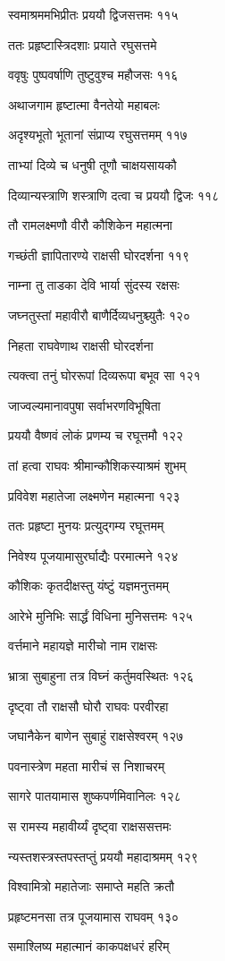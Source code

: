 स्वमाश्रममभिप्रीतः प्रययौ द्विजसत्तमः ११५

ततः प्रहृष्टास्त्रिदशाः प्रयाते रघुसत्तमे

ववृषुः पुष्पवर्षाणि तुष्टुवुश्च महौजसः ११६

अथाजगाम हृष्टात्मा वैनतेयो महाबलः

अदृश्यभूतो भूतानां संप्राप्य रघुसत्तमम् ११७

ताभ्यां दिव्ये च धनुषी तूणौ चाक्षयसायकौ

दिव्यान्यस्त्राणि शस्त्राणि दत्वा च प्रययौ द्विजः ११८

तौ रामलक्ष्मणौ वीरौ कौशिकेन महात्मना

गच्छंती ज्ञापितारण्ये राक्षसी घोरदर्शना ११९

नाम्ना तु ताडका देवि भार्या सुंदस्य रक्षसः

जघ्नतुस्तां महावीरौ बाणैर्दिव्यधनुश्च्युतैः १२०

निहता राघवेणाथ राक्षसी घोरदर्शना

त्यक्त्वा तनुं घोररूपां दिव्यरूपा बभूव सा १२१

जाज्वल्यमानावपुषा सर्वाभरणविभूषिता

प्रययौ वैष्णवं लोकं प्रणम्य च रघूत्तमौ १२२

तां हत्वा राघवः श्रीमान्कौशिकस्याश्रमं शुभम्

प्रविवेश महातेजा लक्ष्मणेन महात्मना १२३

ततः प्रहृष्टा मुनयः प्रत्युद्गम्य रघूत्तमम्

निवेश्य पूजयामासुरर्घाद्यैः परमात्मने १२४

कौशिकः कृतदीक्षस्तु यंष्टुं यज्ञमनुत्तमम्

आरेभे मुनिभिः सार्द्धं विधिना मुनिसत्तमः १२५

वर्त्तमाने महायज्ञे मारीचो नाम राक्षसः

भ्रात्रा सुबाहुना तत्र विघ्नं कर्तुमवस्थितः १२६

दृष्ट्वा तौ राक्षसौ घोरौ राघवः परवीरहा

जघानैकेन बाणेन सुबाहुं राक्षसेश्वरम् १२७

पवनास्त्रेण महता मारीचं स निशाचरम्

सागरे पातयामास शुष्कपर्णमिवानिलः १२८

स रामस्य महावीर्य्यं दृष्ट्वा राक्षससत्तमः

न्यस्तशस्त्रस्तपस्तप्तुं प्रययौ महादाश्रमम् १२९

विश्वामित्रो महातेजाः समाप्ते महति क्रतौ

प्रहृष्टमनसा तत्र पूजयामास राघवम् १३०

समाश्लिष्य महात्मानं काकपक्षधरं हरिम्

